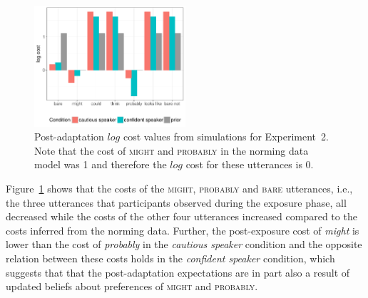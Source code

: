 \documentclass[man, floatsintext]{apa6}
\begin{document}
\begin{figure}
\center
  \includegraphics[width=0.5\textwidth]{plots/adaptation-posterior-costs-replication.pdf}
  \caption{Post-adaptation $log$ cost values from simulations for Experiment~2. Note that the cost of \textsc{might} and \textsc{probably} 
  in the norming data model was 1 and therefore the $log$ cost for these utterances is 0. \label{fig:post-exposure-costs}}
\end{figure}

Figure~\ref{fig:post-exposure-costs} shows that the costs of the \textsc{might}, \textsc{probably} and
\textsc{bare} utterances, i.e., the three utterances that participants observed during the exposure phase,
all decreased while the costs of the other four utterances increased compared to the costs inferred from the norming
data. Further, the post-exposure cost of \textit{might} is lower than the cost of \textit{probably} in the \textit{cautious speaker} condition
and the opposite relation between these costs holds in the \textit{confident speaker} condition, which suggests that
that the post-adaptation expectations are in part also a result of updated beliefs about preferences of \textsc{might} and \textsc{probably}. 



\end{document}
